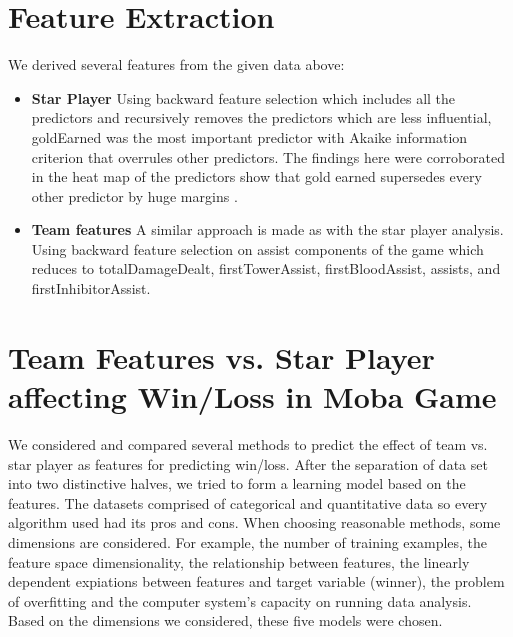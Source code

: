 \documentclass[conference]{IEEEtran}
\begin{document}
\section{Feature Extraction}
We derived several features from the given data above: 
\begin{itemize}
  \item \textbf{Star Player}  Using backward feature selection which includes all the predictors and recursively removes the predictors which are less influential, goldEarned was the most important predictor with Akaike information criterion that overrules other predictors. The findings here were corroborated in the heat map of the predictors show that gold earned supersedes every other predictor by huge margins \cite{Patterson}. 
  \item \textbf{Team features}  A similar approach is made as with the star player analysis. Using backward feature selection on assist components of the game which reduces to totalDamageDealt, firstTowerAssist, firstBloodAssist, assists, and firstInhibitorAssist. 
\end{itemize}

\section{Team Features vs. Star Player affecting Win/Loss in Moba Game}


We considered and compared several methods to predict the effect of team vs. star player as features for predicting win/loss. 
After the separation of data set into two distinctive halves, we tried to form a learning model based on the features. The datasets comprised of categorical and quantitative data so every algorithm used had its pros and cons. When choosing reasonable methods, some dimensions are considered. For example, the number of training examples, the feature space dimensionality, the relationship between features, the linearly dependent expiations between features and target variable (winner), the problem of overfitting and the computer system’s capacity on running data analysis. Based on the dimensions we considered, these five models were chosen.
\end{document}
